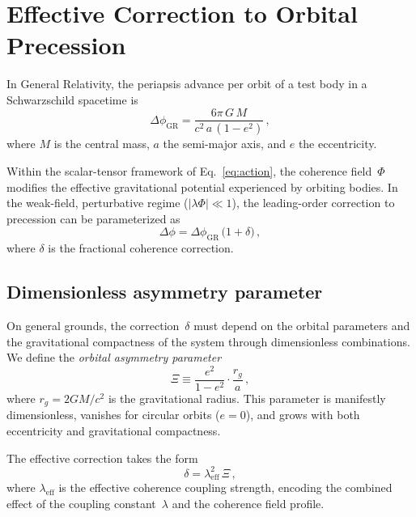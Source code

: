 \documentclass[showpacs,preprintnumbers,amsmath,amssymb,prd,longbibliography]{revtex4-2}
\begin{document}
\section{Effective Correction to Orbital Precession}
\label{sec:precession}

In General Relativity, the periapsis advance per orbit of a
test body in a Schwarzschild spacetime is~\cite{Weinberg1972}
\begin{equation}
\Delta\phi_{\mathrm{GR}} = \frac{6\pi\,G\,M}{c^2\,a\,(1-e^2)}\,,
\label{eq:GR-precession}
\end{equation}
where $M$ is the central mass, $a$ the semi-major axis,
and $e$ the eccentricity.

Within the scalar-tensor framework of Eq.~\eqref{eq:action},
the coherence field~$\Phi$ modifies the effective gravitational
potential experienced by orbiting bodies.
In the weak-field, perturbative regime ($|\lambda\Phi| \ll 1$),
the leading-order correction to precession can be parameterized as
\begin{equation}
\Delta\phi = \Delta\phi_{\mathrm{GR}}\,\big(1 + \delta\big)\,,
\label{eq:tgu-precession}
\end{equation}
where $\delta$ is the fractional coherence correction.

\subsection{Dimensionless asymmetry parameter}

On general grounds, the correction~$\delta$ must depend on
the orbital parameters and the gravitational compactness of the
system through dimensionless combinations.
We define the \emph{orbital asymmetry parameter}
\begin{equation}
\Xi \equiv \frac{e^2}{1-e^2}\cdot\frac{r_g}{a}\,,
\label{eq:Xi-def}
\end{equation}
where $r_g = 2GM/c^2$ is the gravitational radius.
This parameter is manifestly dimensionless, vanishes for circular
orbits ($e = 0$), and grows with both eccentricity and
gravitational compactness.

The effective correction takes the form
\begin{equation}
\delta = \lambda_{\mathrm{eff}}^2\,\Xi\,,
\label{eq:delta-def}
\end{equation}
where $\lambda_{\mathrm{eff}}$ is the effective coherence coupling
strength, encoding the combined effect of the coupling constant~$\lambda$
and the coherence field profile.
\end{document}
